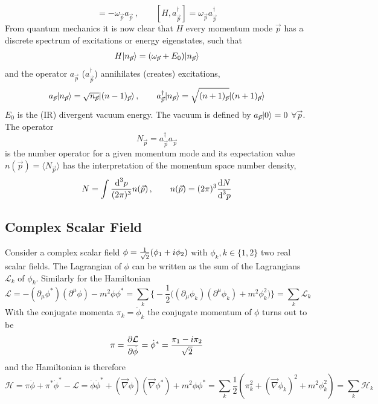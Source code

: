 \begin{equation}
    [H,a_{\vec{p}}]=-\omega_{\vec{p}}a_{\vec{p}}\,,\qquad[H,a_{\vec{p}}^\dagger]=\omega_{\vec{p}}a_{\vec{p}}^\dagger
\end{equation}
From quantum mechanics it is now clear that $H$ every momentum mode $\vec{p}$ has a discrete spectrum of excitations or energy eigenstates, such that
\begin{equation}
    H{\lvert n_{\vec{p}}\rangle}=(\omega_{\vec{p}}+E_0){\lvert n_{\vec{p}}\rangle}
\end{equation}
and the operator $a_{\vec{p}}$ ($a_{\vec{p}}^\dagger$) annihilates (creates) excitations,
\begin{equation}
    a_{\vec{p}}{\lvert n_{\vec{p}}\rangle}=\sqrt{n_{\vec{p}}} {\lvert(n-1)_{\vec{p}}\rangle}\,,\qquad a_{\vec{p}}^\dagger{\lvert n_{\vec{p}}\rangle}= \sqrt{(n+1)_{\vec{p}}}{\lvert(n+1)_{\vec{p}}\rangle}
\end{equation}
$E_0$ is the (IR) divergent vacuum energy. The vacuum is defined by $a_{\vec{p}}{\lvert0\rangle}=0$ $\forall\vec{p}$. The operator
\begin{equation}
    N_{\vec{p}}=a_{\vec{p}}^\dagger a_{\vec{p}}
\end{equation}
is the number operator for a given momentum mode and its expectation value $n(\vec{p})=\langle N_{\vec{p}}\rangle$ has the interpretation of the momentum space number density,
\begin{equation}
    N=\int\frac{\text{d}^3p}{(2\pi)^3}n(\vec{p})\,,\qquad n(\vec{p})=(2\pi)^3\frac{\text{d} N}{\text{d}^3p}
\end{equation}

\subsection{Complex Scalar Field}

Consider a complex scalar field $\phi=\frac{1}{\sqrt{2}}(\phi_1+{i}\phi_2)$ with $\phi_k,k\in\{1,2\}$ two real scalar fields. The Lagrangian of $\phi$ can be written as the sum of the Lagrangians $\mathcal{L}_k$ of $\phi_k$. Similarly for the Hamiltonian
\begin{equation}
    \mathcal{L}=-(\partial_\mu\phi^*)(\partial^\mu\phi)-m^2\phi\phi^*=\sum_{k}\Big\{-\frac{1}{2}\Big((\partial_\mu\phi_k)(\partial^\mu\phi_k)+m^2\phi_k^2\Big)\Big\}=\sum_k\mathcal{L}_k
\end{equation}
With the conjugate momenta $\pi_k=\dot{\phi}_k$ the conjugate momentum of $\phi$ turns out to be
\begin{equation}
    \pi=\frac{\partial\mathcal{L}}{\partial\dot{\phi}}=\dot{\phi}^*=\frac{\pi_1-{i}\pi_2}{\sqrt{2}}
\end{equation}
and the Hamiltonian is therefore
\begin{equation}
    \mathcal{H}=\pi\dot{\phi}+\pi^*\dot{\phi}^*-\mathcal{L}=\dot{\phi}\dot{\phi}^*+(\vec{\nabla}\phi)(\vec{\nabla}\phi^*)+m^2\phi\phi^*=\sum_k\frac{1}{2}(\pi_k^2+(\vec{\nabla}\phi_k)^2+m^2\phi_k^2)=\sum_k\mathcal{H}_k
\end{equation}

